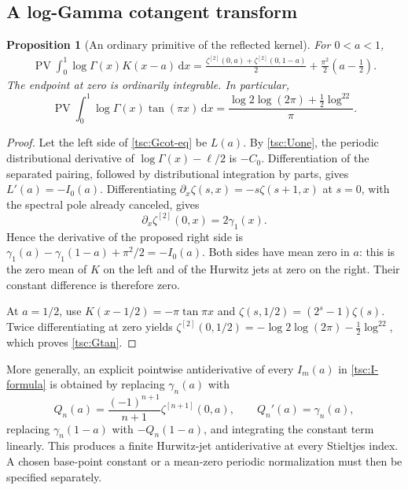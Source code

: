 \documentclass[11pt]{article}
\numberwithin{equation}{section}
\newtheorem{proposition}[theorem]{Proposition}
\theoremstyle{definition}\newtheorem{definition}[theorem]{Definition}
\theoremstyle{remark}\newtheorem{remark}[theorem]{Remark}
\DeclareMathOperator{\PV}{PV}
\newcommand{\dd}{\,\mathrm d}
\begin{document}
\subsection{A log-Gamma cotangent transform}
\begin{proposition}[An ordinary primitive of the reflected kernel]\label{tsc:Gcot}
For $0<a<1$,
\begin{align}\label{tsc:Gcot-eq}
 \PV\int_0^1\log\Gamma(x)K(x-a)\dd x
   =\frac{\zeta^{[2]}(0,a)+\zeta^{[2]}(0,1-a)}2
        +\frac{\pi^2}{2}\left(a-\frac12\right).
\end{align}
The endpoint at zero is ordinarily integrable. In particular,
\begin{equation}\label{tsc:Gtan}
 \PV\int_0^1\log\Gamma(x)\tan(\pi x)\dd x
    =\frac{\log2\log(2\pi)+\tfrac12\log^22}{\pi}.
\end{equation}
\end{proposition}
\begin{proof}
Let the left side of \eqref{tsc:Gcot-eq} be $L(a)$.
By \eqref{tsc:Uone}, the periodic distributional derivative of
$\log\Gamma(x)-\ell/2$ is $-C_0$. Differentiation of the separated
pairing, followed by distributional integration by parts, gives
$L'(a)=-I_0(a)$.
Differentiating $\partial_x\zeta(s,x)=-s\zeta(s+1,x)$ at $s=0$, with
the spectral pole already canceled, gives
\[
 \partial_x\zeta^{[2]}(0,x)=2\gamma_1(x).
\]
Hence the derivative of the proposed right side is
$\gamma_1(a)-\gamma_1(1-a)+\pi^2/2=-I_0(a)$.
Both sides have mean zero in $a$: this is the zero mean of $K$ on the
left and of the Hurwitz jets at zero on the right. Their constant difference
is therefore zero.

At $a=1/2$, use $K(x-1/2)=-\pi\tan\pi x$ and
$\zeta(s,1/2)=(2^s-1)\zeta(s)$. Twice differentiating at zero yields
$\zeta^{[2]}(0,1/2)=-\log2\log(2\pi)-\tfrac12\log^22$, which proves
\eqref{tsc:Gtan}.
\end{proof}

More generally, an explicit pointwise antiderivative of every $I_m(a)$ in
\eqref{tsc:I-formula} is obtained by replacing $\gamma_n(a)$ with
\[
 Q_n(a)=\frac{(-1)^{n+1}}{n+1}\zeta^{[n+1]}(0,a),\qquad Q_n'(a)=\gamma_n(a),
\]
replacing $\gamma_n(1-a)$ with $-Q_n(1-a)$, and integrating the constant
term linearly. This produces a finite Hurwitz-jet antiderivative at every
Stieltjes index. A chosen base-point constant or a mean-zero periodic
normalization must then be specified separately.

\end{document}
